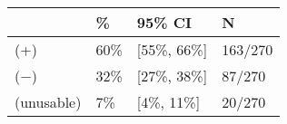 \begin{tabular}{llll}
\hline
& \% & 95\% CI  & N \\
\hline
(+) & 60\% & [55\%, 66\%] & 163/270\\
($-$) & 32\% & [27\%, 38\%] & 87/270\\
(unusable) & 7\% & [4\%, 11\%] & 20/270\\
\hline
\end{tabular}
